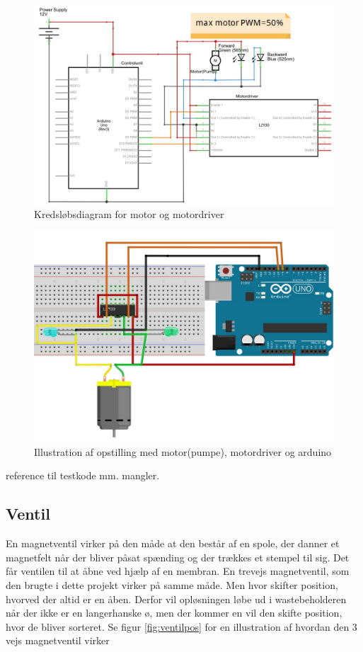  \begin{figure}[H]
	\centering
	\includegraphics[width=1\textwidth]{billeder/Hardware/diagrammer/motordiagram.JPG}
	\caption{Kredsløbsdiagram for motor og motordriver}
	\label{fig:motordriverdiagram}
\end{figure}

 \begin{figure}[H]
	\centering
	\includegraphics[width=1\textwidth]{billeder/Hardware/diagrammer/Motorbreadboard.JPG}
	\caption{Illustration af opstilling med motor(pumpe), motordriver og arduino}
	\label{fig:Motorbreadboard}
\end{figure}

reference til testkode mm. mangler.


 \subsection{Ventil}
 En magnetventil virker på den måde at den består af en spole, der danner et magnetfelt når der bliver påsat spænding og der trækkes et stempel til sig. Det får ventilen til at åbne ved hjælp af en membran. En trevejs magnetventil, som den brugte i dette projekt virker på samme måde. Men hvor skifter position, hvorved der altid er en åben. Derfor vil opløsningen løbe ud i wastebeholderen når der ikke er en langerhanske ø, men der kommer en vil den skifte position, hvor de bliver sorteret. Se figur \ref{fig:ventilpos} for en illustration af hvordan den 3 vejs magnetventil virker

